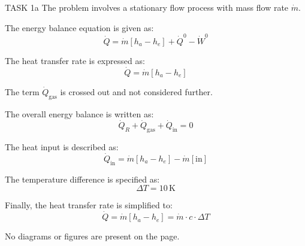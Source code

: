 TASK 1a  
The problem involves a stationary flow process with mass flow rate \( \dot{m} \).  

The energy balance equation is given as:  
\[
\dot{Q} = \dot{m} \left[ h_a - h_e \right] + \dot{Q}^0 - \dot{W}^0
\]  

The heat transfer rate is expressed as:  
\[
\dot{Q} = \dot{m} \left[ h_a - h_e \right]
\]  

The term \( \dot{Q}_{\text{gas}} \) is crossed out and not considered further.  

The overall energy balance is written as:  
\[
\dot{Q}_R + \dot{Q}_{\text{gas}} + \dot{Q}_{\text{in}} = 0
\]  

The heat input is described as:  
\[
\dot{Q}_{\text{in}} = \dot{m} \left[ h_a - h_e \right] - \dot{m} \left[ \text{in} \right]
\]  

The temperature difference is specified as:  
\[
\Delta T = 10 \, \text{K}
\]  

Finally, the heat transfer rate is simplified to:  
\[
\dot{Q} = \dot{m} \left[ h_a - h_e \right] = \dot{m} \cdot c \cdot \Delta T
\]  

No diagrams or figures are present on the page.